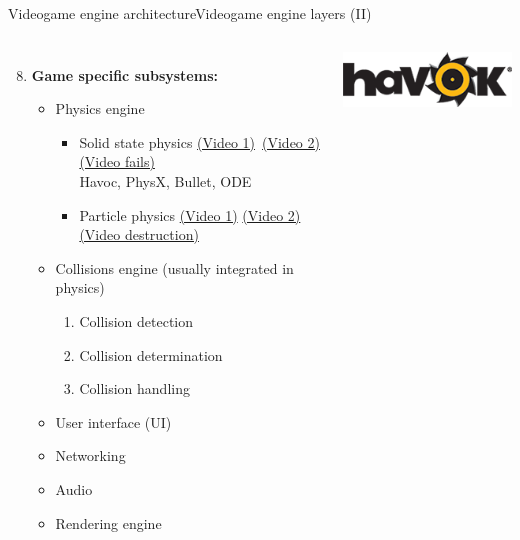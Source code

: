 \documentclass[10pt,compress]{beamer} %
\begin{document}
\begin{frame}{Videogame engine architecture}{Videogame engine layers (II)}
    \begin{columns}
	\begin{enumerate}
	\setcounter{enumi}{7}
	\item \textbf{Game specific subsystems:} 
		\begin{itemize}
		\item Physics engine
			\begin{itemize}
			\item Solid state physics \href{https://www.youtube.com/watch?v=PfezSJB21vk}{(Video 1)} \href{https://www.youtube.com/watch?v=q0xCYm6B9yE}{(Video 2)} \href{https://www.youtube.com/watch?v=2z__y42rir8}{(Video fails)}\\
			Havoc, PhysX, Bullet, ODE\\
			\item Particle physics \href{https://www.youtube.com/watch?v=x8Fo2slT2WA}{(Video 1)} \href{https://www.youtube.com/watch?v=Jl54WZtm0QE}{(Video 2)}\\
            \href{https://www.youtube.com/watch?v=1IZsvuIvjXY}{(Video destruction)}
			\end{itemize}
		\item Collisions engine (usually integrated in physics)
			\begin{enumerate}[i]
			\item Collision detection
			\item Collision determination
			\item Collision handling
			\end{enumerate}
		\item User interface (UI)
		\item Networking
		\item Audio
		\item Rendering engine
		\end{itemize}
	\end{enumerate}
			\centering\includegraphics[width=0.9\linewidth]{figs/havok}\\\smallskip

\end{columns}
\end{frame}
\end{document}
